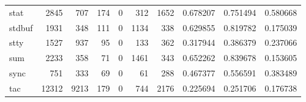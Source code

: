 \begin{longtable}{lrrrrrrrrr}
stat      &                                               2845 &                                                707 &                                                174 &                                                  0 &                                                312 &                                               1652 &                                           0.678207 &                               0.751494 &                             0.580668 \\
stdbuf    &                                               1931 &                                                348 &                                                111 &                                                  0 &                                               1134 &                                                338 &                                           0.629855 &                               0.819782 &                             0.175039 \\
stty      &                                               1527 &                                                937 &                                                 95 &                                                  0 &                                                133 &                                                362 &                                           0.317944 &                               0.386379 &                             0.237066 \\
sum       &                                               2233 &                                                358 &                                                 71 &                                                  0 &                                               1461 &                                                343 &                                           0.652262 &                               0.839678 &                             0.153605 \\
sync      &                                                751 &                                                333 &                                                 69 &                                                  0 &                                                 61 &                                                288 &                                           0.467377 &                               0.556591 &                             0.383489 \\
tac       &                                              12312 &                                               9213 &                                                179 &                                                  0 &                                                744 &                                               2176 &                                           0.225694 &                               0.251706 &                             0.176738 \\

\end{longtable}
